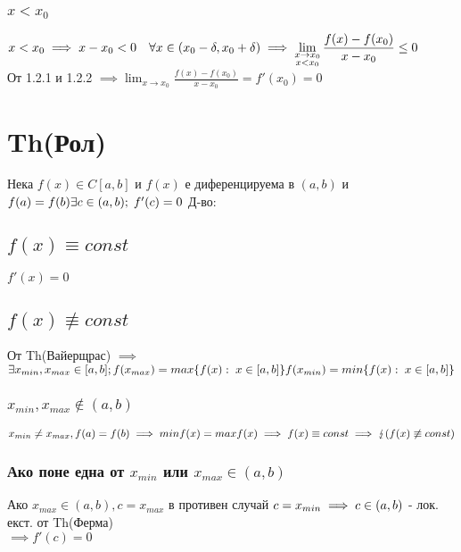 \documentclass{article}
\newcommand{\spc}[0]{\quad}
\newcommand{\cntrdcn}[0]{\lightning}
\begin{document}
    \subsubsection{\(x < x_0\)}
    \(x < x_0 \implies x - x_0 < 0 \spc \forall x \in (x_0 - \delta, x_0 + \delta)\\
    \implies \displaystyle\lim\limits_{\substack{x \to x_0 \\ x < x_0}} \frac{f(x) - f(x_0)}{x - x_0} \leq 0\)\\
    От 1.2.1 и 1.2.2 \(\implies \displaystyle\lim_{x \to x_0} \frac{f(x) - f(x_0)}{x - x_0} = f'(x_0) = 0\)
    \section{Th(Рол)}
    Нека \(f(x) \in C[a, b]\) и \(f(x)\) е диференцируема в \((a, b)\) и \(f(a) = f(b)\\
    \exists c \in (a, b); \; f'(c) = 0\)
    \bigbreak
    Д-во:
    \subsection{\(f(x) \equiv const\)}
    \(f'(x) = 0\)
    \subsection{\(f(x) \not\equiv const\)}
    От Th(Вайерщрас) \(\implies\)\\
    \(\exists x_{min}, x_{max} \in [a, b];\\
    f(x_{max}) = max\{f(x) : \; x \in [a, b]\}\\
    f(x_{min}) = min\{f(x) : \; x \in [a, b]\}\)
    \subsubsection{\(x_{min}, x_{max} \notin (a, b)\)}
    \(x_{min} \neq x_{max}, f(a) = f(b) \implies minf(x) = maxf(x)\\
    \implies f(x) \equiv const \implies \cntrdcn (f(x) \not\equiv const)\)
    \subsubsection{Ако поне една от \(x_{min}\) или \(x_{max} \in (a, b)\)}
    Ако \(x_{max} \in (a, b), c = x_{max}\) в противен случай \(c = x_{min}\\
    \implies c \in (a, b)\) - лок. екст. от Th(Ферма)\\
    \(\implies f'(c) = 0\)
\end{document}
